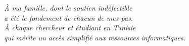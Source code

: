 \thispagestyle{empty}
\vspace*{5cm}
\begin{flushright}
  \itshape
  À ma famille, dont le soutien indéfectible\\
  a été le fondement de chacun de mes pas.\\[1em]
  À chaque chercheur et étudiant en Tunisie\\
  qui mérite un accès simplifié aux ressources informatiques.
\end{flushright}
\clearpage
